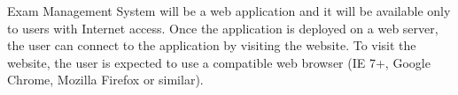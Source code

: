 
Exam Management System  will be a web application and it will be available only to users with Internet access. 
Once the application is deployed on a web server, the user can connect to the application by visiting the website. 
To visit the website, the user is expected to use a compatible web browser (IE 7+, Google Chrome, Mozilla Firefox or similar).
